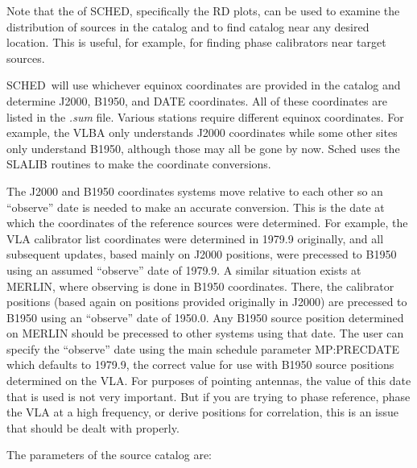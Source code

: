 \documentclass{report}
\newcommand{\sched}{{\sc SCHED}}
\newcommand{\schedb}{{\sc SCHED~}}
\begin{document}
Note that the  of \sched,
specifically the RD plots, can be used to examine the distribution
of sources in the catalog and to find catalog near any desired
location.  This is useful, for example, for finding phase calibrators
near target sources.

\schedb will use whichever equinox coordinates are provided in the
catalog and determine J2000, B1950, and DATE coordinates.  All of
these coordinates are listed in the {\sl .sum} file.  Various stations
require different equinox coordinates.  For example, the VLBA only
understands J2000 coordinates while some other sites only understand
B1950, although those may all be gone by now.  Sched uses the SLALIB
routines to make the coordinate conversions.

The J2000 and B1950 coordinates systems move relative to each other so
an ``observe'' date is needed to make an accurate conversion.  This is
the date at which the coordinates of the reference sources were
determined.  For example, the VLA calibrator list coordinates were
determined in 1979.9 originally, and all subsequent updates, based
mainly on J2000 positions, were precessed to B1950 using an assumed
``observe'' date of 1979.9.  A similar situation exists at MERLIN,
where observing is done in B1950 coordinates.  There, the calibrator
positions (based again on positions provided originally in J2000) are
precessed to B1950 using an ``observe'' date of 1950.0.  Any B1950
source position determined on MERLIN should be precessed to other
systems using that date.  The user can specify the ``observe'' date
using the main schedule parameter 
{MP:PRECDATE} which defaults to 1979.9, the correct value for use with
B1950 source positions determined on the VLA.  For purposes of
pointing antennas, the value of this date that is used is not very
important.  But if you are trying to phase reference, phase the VLA at
a high frequency, or derive positions for correlation, this is an
issue that should be dealt with properly.

The parameters of the source catalog are:
\end{document}
